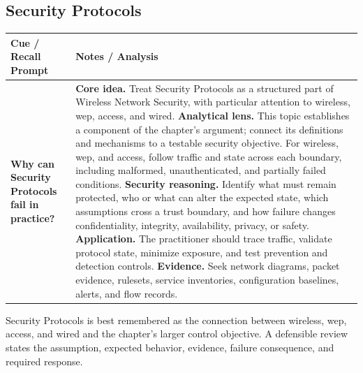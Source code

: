 \documentclass[11pt]{article}
\newcommand{\CornellHeader}{%
\rowcolor{Navy}\color{white}\bfseries Cue / Recall Prompt & \color{white}\bfseries Notes / Analysis\\\hline}
\newcommand{\CornellRow}[2]{%
\cellcolor{CueGray}\RaggedRight\textbf{#1} & \RaggedRight #2\\\hline}
\begin{document}
\subsection*{Security Protocols}
\begin{longtable}{>{\RaggedRight\arraybackslash}p{}|>{\RaggedRight\arraybackslash}p{}}
\CornellHeader
\CornellRow{Why can Security Protocols fail in practice?}{\textbf{Core idea.} Treat Security Protocols as a structured part of Wireless Network Security, with particular attention to wireless, wep, access, and wired. \textbf{Analytical lens.} This topic establishes a component of the chapter's argument; connect its definitions and mechanisms to a testable security objective. For wireless, wep, and access, follow traffic and state across each boundary, including malformed, unauthenticated, and partially failed conditions. \textbf{Security reasoning.} Identify what must remain protected, who or what can alter the expected state, which assumptions cross a trust boundary, and how failure changes confidentiality, integrity, availability, privacy, or safety. \textbf{Application.} The practitioner should trace traffic, validate protocol state, minimize exposure, and test prevention and detection controls. \textbf{Evidence.} Seek network diagrams, packet evidence, rulesets, service inventories, configuration baselines, alerts, and flow records.}
\end{longtable}
\begin{topicsummary}
Security Protocols is best remembered as the connection between wireless, wep, access, and wired and the chapter's larger control objective. A defensible review states the assumption, expected behavior, evidence, failure consequence, and required response.
\end{topicsummary}
\end{document}
